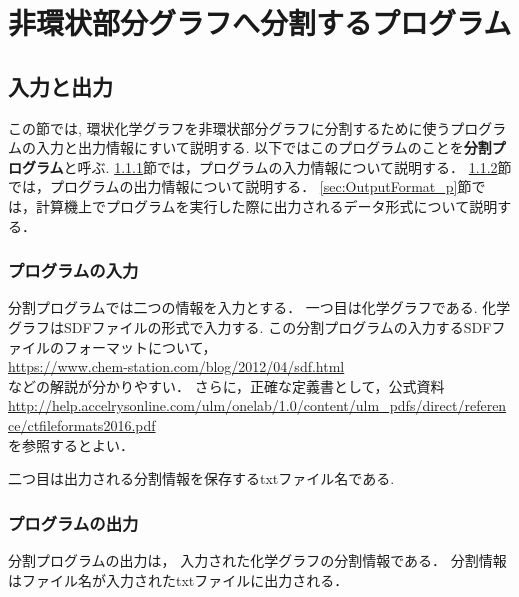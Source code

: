 \documentclass[11pt,titlepage,dvipdfmx,twoside]{jarticle}
\begin{document}
\section{非環状部分グラフへ分割するプログラム}
\label{sec: partition}

\subsection{入力と出力}
\label{sec:InOut_p}

この節では, 環状化学グラフを非環状部分グラフに分割するために使うプログラムの入力と出力情報にすいて説明する.
以下ではこのプログラムのことを{\bf 分割プログラム}と呼ぶ.
\ref{sec:Input_p}節では，プログラムの入力情報について説明する．
\ref{sec:Output_p}節では，プログラムの出力情報について説明する．
\ref{sec:OutputFormat_p}節では，計算機上でプログラムを実行した際に出力されるデータ形式について説明する．

\subsubsection{プログラムの入力}
\label{sec:Input_p}

分割プログラムでは二つの情報を入力とする．
一つ目は化学グラフである.
化学グラフはSDFファイルの形式で入力する.
この分割プログラムの入力するSDFファイルのフォーマットについて，\\
\url{https://www.chem-station.com/blog/2012/04/sdf.html}\\
などの解説が分かりやすい．
さらに，正確な定義書として，公式資料\\
\url{http://help.accelrysonline.com/ulm/onelab/1.0/content/ulm_pdfs/direct/reference/ctfileformats2016.pdf}\\
を参照するとよい．

二つ目は出力される分割情報を保存するtxtファイル名である.
\bigskip

\subsubsection{プログラムの出力}
\label{sec:Output_p}

分割プログラムの出力は，
入力された化学グラフの分割情報である．
分割情報はファイル名が入力されたtxtファイルに出力される．
\end{document}
